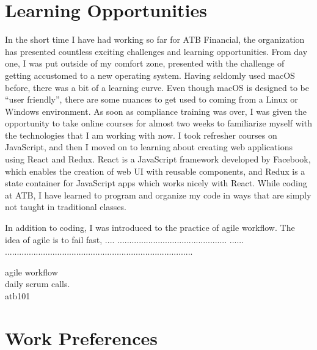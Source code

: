 \documentclass[letterpaper,12pt]{article}
\begin{document}


\section{Learning Opportunities}

In the short time I have had working so far for ATB Financial, the organization has presented
countless exciting challenges and learning opportunities.
From day one, I was put outside of my comfort zone, presented with the challenge of
getting accustomed to a new operating system. Having seldomly used macOS before,
there was a bit of a learning curve. Even though macOS is designed to be ``user friendly'',
there are some nuances to get used to coming from a Linux or Windows environment.
As soon as compliance training was over, I was given the opportunity to take online
courses for almost two weeks to familiarize myself with the technologies that I am
working with now. I took refresher courses on JavaScript, and then I moved on to learning
about creating web applications using React and Redux. React is a JavaScript framework developed by Facebook,
which enables the creation of web UI with reusable components\cite{react}, and Redux is a state container
for JavaScript apps\cite{redux} which works nicely with React. While coding at ATB,
I have learned to program and organize my code in ways that are simply not taught in traditional
classes.


In addition to coding, I was introduced to the practice of agile workflow. The idea of agile is to
fail fast, .... .............................................. ...... \cite{}
...............................................................................

agile workflow\\
daily scrum calls.\\
atb101


\section{Work Preferences}
\end{document}
